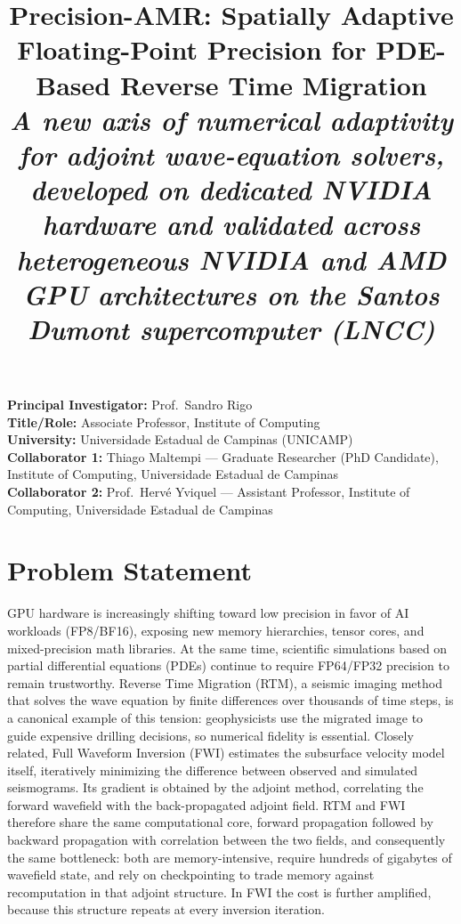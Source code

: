 \documentclass[12pt,a4paper]{article}
\title{\textbf{Precision-AMR: Spatially Adaptive Floating-Point Precision
for PDE-Based Reverse Time Migration}\\[0.5em]
\large\normalfont\itshape A new axis of numerical adaptivity for adjoint
wave-equation solvers, developed on dedicated NVIDIA hardware and validated
across heterogeneous NVIDIA and AMD GPU architectures on the Santos Dumont
supercomputer (LNCC)}
\author{}
\date{}
\begin{document}
\maketitle
\thispagestyle{empty}

\begin{flushleft}
\textbf{Principal Investigator:} Prof.\ Sandro Rigo\\
\textbf{Title/Role:} Associate Professor, Institute of Computing\\
\textbf{University:} Universidade Estadual de Campinas (UNICAMP)\\[0.4em]
\textbf{Collaborator 1:} Thiago Maltempi --- Graduate Researcher (PhD
Candidate), Institute of Computing, Universidade Estadual de Campinas\\
\textbf{Collaborator 2:} Prof.\ Herv\'e Yviquel --- Assistant Professor,
Institute of Computing, Universidade Estadual de Campinas
\end{flushleft}

\section{Problem Statement}

GPU hardware is increasingly shifting toward low precision in favor of AI
workloads (FP8/BF16), exposing new memory hierarchies, tensor cores, and
mixed-precision math libraries. At the same time, scientific simulations
based on partial differential equations (PDEs) continue to require FP64/FP32
precision to remain trustworthy. Reverse Time Migration (RTM), a seismic
imaging method that solves the wave equation by finite differences over
thousands of time steps, is a canonical example of this tension:
geophysicists use the migrated image to guide expensive drilling decisions,
so numerical fidelity is essential. Closely related, Full Waveform Inversion
(FWI) estimates the subsurface velocity model itself, iteratively minimizing
the difference between observed and simulated seismograms. Its gradient is
obtained by the adjoint method, correlating the forward wavefield with the
back-propagated adjoint field. RTM and FWI therefore share the same
computational core, forward propagation followed by backward propagation
with correlation between the two fields, and consequently the same
bottleneck: both are memory-intensive, require hundreds of gigabytes of
wavefield state, and rely on checkpointing to trade memory against
recomputation in that adjoint structure. In FWI the cost is further
amplified, because this structure repeats at every inversion iteration.
\end{document}
